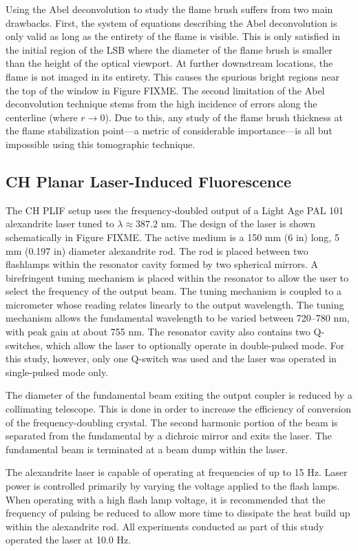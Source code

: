 Using the Abel deconvolution to study the flame brush suffers from two main drawbacks.
First, the system of equations describing the Abel deconvolution is only valid as long as the entirety of the flame is visible.
This is only satisfied in the initial region of the LSB where the diameter of the flame brush is smaller than the height of the optical viewport.
At further downstream locations, the flame is not imaged in its entirety.
This causes the spurious bright regions near the top of the window in Figure FIXME.
The second limitation of the Abel deconvolution technique stems from the high incidence of errors along the centerline (where \(r \to 0\)).
Due to this, any study of the flame brush thickness at the flame stabilization point---a metric of considerable importance---is all but impossible using this tomographic technique.

\subsection{CH Planar Laser-Induced Fluorescence}

The CH PLIF setup uses the frequency-doubled output of a Light Age PAL 101 alexandrite laser tuned to \(\lambda \approx 387.2\) nm.
The design of the laser is shown schematically in Figure FIXME.
The active medium is a 150 mm (6 in) long, 5 mm (0.197 in) diameter alexandrite rod.
The rod is placed between two flashlamps within the resonator cavity formed by two spherical mirrors.
A birefringent tuning mechanism is placed within the resonator to allow the user to select the frequency of the output beam.
The tuning mechanism is coupled to a micrometer whose reading relates linearly to the output wavelength.
The tuning mechanism allows the fundamental wavelength to be varied between 720--780 nm, with peak gain at about 755 nm.
The resonator cavity also contains two Q-switches, which allow the laser to optionally operate in double-pulsed mode.
For this study, however, only one Q-switch was used and the laser was operated in single-pulsed mode only.

The diameter of the fundamental beam exiting the output coupler is reduced by a collimating telescope.
This is done in order to increase the efficiency of conversion of the frequency-doubling crystal.
The second harmonic portion of the beam is separated from the fundamental by a dichroic mirror and exits the laser.
The fundamental beam is terminated at a beam dump within the laser.

The alexandrite laser is capable of operating at frequencies of up to 15 Hz.
Laser power is controlled primarily by varying the voltage applied to the flash lamps.
When operating with a high flash lamp voltage, it is recommended that the frequency of pulsing be reduced to allow more time to dissipate the heat build up within the alexandrite rod.
All experiments conducted as part of this study operated the laser at 10.0 Hz.

